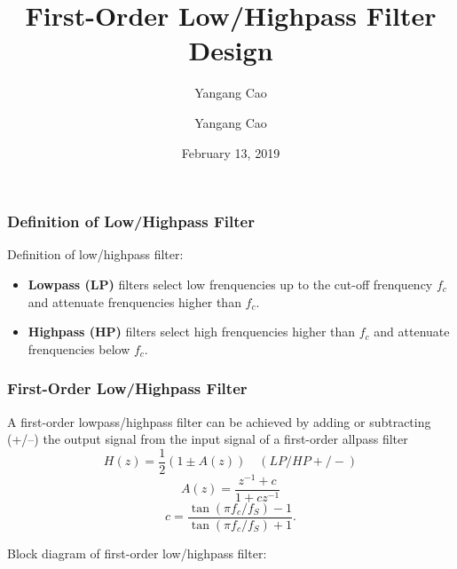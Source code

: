 \documentclass[10pt,a4paper,oneside]{beamer}
\author{Yangang Cao}
\author{Yangang Cao}
\title{First-Order Low/Highpass Filter Design}
\date{February 13, 2019}
\newcommand{\product}{$\displaystyle \times$}
\begin{document}
	
\frame[plain]{\titlepage}

\begin{frame}
\frametitle{Definition of Low/Highpass Filter}
\vspace{1.5cm}
 Definition of low/highpass filter:
\vspace{0.3cm}
\begin{itemize}
	\item {\bfseries Lowpass (LP)} filters select low frenquencies up to the cut-off frenquency $f_c$ and attenuate frenquencies higher than $f_c$.
	\item {\bfseries Highpass (HP)} filters select high frenquencies higher than $f_c$ and attenuate frenquencies below $f_c$.
\end{itemize}
\end{frame}

\begin{frame}
\frametitle{First-Order Low/Highpass Filter}
A first-order lowpass/highpass filter can be achieved by adding or subtracting (+/--) the output signal from the input signal of a first-order allpass filter
\[
H(z) = \frac{1}{2}(1 \pm A(z))\quad(LP/HP+/-)
\]
\[
A(z) = \frac{z^{-1} + c}{1 + cz^{-1}}
\]
\[
c = \frac{\tan(\pi f_c/f_S) - 1}{\tan(\pi f_c/f_S) + 1}.
\]
\end{frame}

\begin{frame}
Block diagram of first-order low/highpass filter:
\begin{center}
\end{center}
\end{frame}
\end{document}
